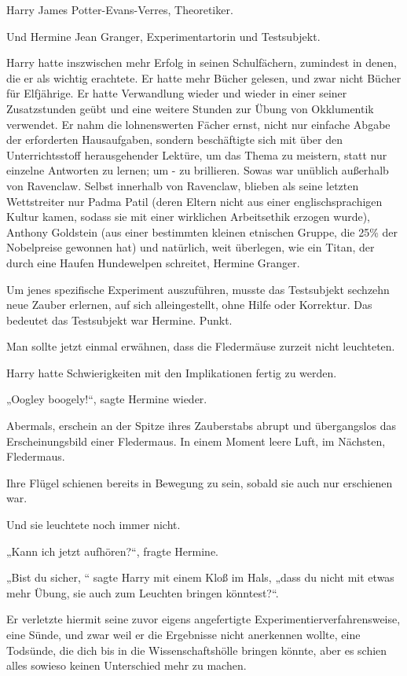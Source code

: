 {Harry James Potter-Evans-Verres, Theoretiker.

Und Hermine Jean Granger, Experimentartorin und Testsubjekt.

Harry hatte inszwischen mehr Erfolg in seinen Schulfächern, zumindest in denen, die er als wichtig erachtete. Er hatte mehr Bücher gelesen, und zwar nicht Bücher für Elfjährige. Er hatte Verwandlung wieder und wieder in einer seiner Zusatzstunden geübt und eine weitere Stunden zur Übung von Okklumentik verwendet. Er nahm die lohnenswerten Fächer ernst, nicht nur einfache Abgabe der erforderten Hausaufgaben, sondern beschäftigte sich mit über den Unterrichtsstoff herausgehender Lektüre, um das Thema zu meistern, statt nur einzelne Antworten zu lernen; um - zu brillieren. Sowas war unüblich außerhalb von Ravenclaw. Selbst innerhalb von Ravenclaw, blieben als seine letzten Wettstreiter nur Padma Patil (deren Eltern nicht aus einer englischsprachigen Kultur kamen, sodass sie mit einer wirklichen Arbeitsethik erzogen wurde), Anthony Goldstein (aus einer bestimmten kleinen etnischen Gruppe, die 25\% der Nobelpreise gewonnen hat) und natürlich, weit überlegen, wie ein Titan, der durch eine Haufen Hundewelpen schreitet, Hermine Granger.

Um jenes spezifische Experiment auszuführen, musste das Testsubjekt sechzehn neue Zauber erlernen, auf sich alleingestellt, ohne Hilfe oder Korrektur. Das bedeutet das Testsubjekt war Hermine. Punkt.

Man sollte jetzt einmal erwähnen, dass die Fledermäuse zurzeit nicht leuchteten.

Harry hatte Schwierigkeiten mit den Implikationen fertig zu werden.

„Oogley boogely!“, sagte Hermine wieder.

Abermals, erschein an der Spitze ihres Zauberstabs abrupt und übergangslos das Erscheinungsbild einer Fledermaus. In einem Moment leere Luft, im Nächsten, Fledermaus.

Ihre Flügel schienen bereits in Bewegung zu sein, sobald sie auch nur erschienen war.

Und sie leuchtete noch immer nicht.

„Kann ich jetzt aufhören?“, fragte Hermine.

„Bist du sicher, “ sagte Harry mit einem Kloß im Hals, „dass du nicht mit etwas mehr Übung, sie auch zum Leuchten bringen könntest?“.

Er verletzte hiermit seine zuvor eigens angefertigte Experimentierverfahrensweise, eine Sünde, und zwar weil er die Ergebnisse nicht anerkennen wollte, eine Todsünde, die dich bis in die Wissenschaftshölle bringen könnte, aber es schien alles sowieso keinen Unterschied mehr zu machen.

}
